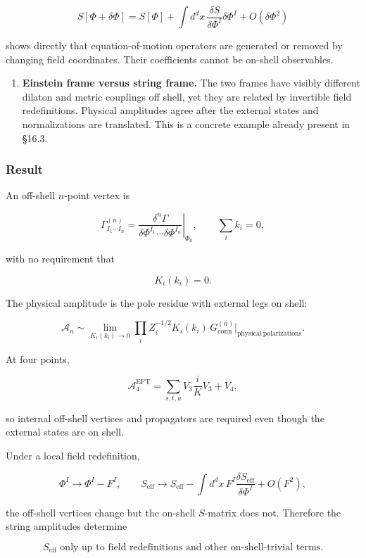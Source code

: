 \documentclass[
  10pt,
  a4paper,
  openany]{book}
\providecommand{\tightlist}{%
  \setlength{\itemsep}{0pt}\setlength{\parskip}{0pt}}
\begin{document}
\[
S[\Phi+\delta\Phi]
=S[\Phi]
+\int d^dx\,
\frac{\delta S}{\delta\Phi^I}\delta\Phi^I
+O(\delta\Phi^2)
\]

shows directly that equation-of-motion operators are generated or
removed by changing field coordinates. Their coefficients cannot be
on-shell observables.

\begin{enumerate}
\def\labelenumi{\arabic{enumi}.}
\setcounter{enumi}{3}
\tightlist
\item
  \textbf{Einstein frame versus string frame.} The two frames have
  visibly different dilaton and metric couplings off shell, yet they are
  related by invertible field redefinitions. Physical amplitudes agree
  after the external states and normalizations are translated. This is a
  concrete example already present in §16.3.
\end{enumerate}

\subsubsection{Result}\label{result-30}

An off-shell \(n\)-point vertex is

\[
\Gamma^{(n)}_{I_1\cdots I_n}
=
\left.
\frac{\delta^n\Gamma}
{\delta\Phi^{I_1}\cdots\delta\Phi^{I_n}}
\right|_{\Phi_0},
\qquad
\sum_i k_i=0,
\]

with no requirement that

\[
K_i(k_i)=0.
\]

The physical amplitude is the pole residue with external legs on shell:

\[
\mathcal A_n
\sim
\lim_{K_i(k_i)\to0}
\prod_i Z_i^{-1/2}K_i(k_i)\,
G^{(n)}_{\mathrm{conn}}
\big|_{\mathrm{physical\ polarizations}}.
\]

At four points,

\[
\mathcal A_4^{\mathrm{EFT}}
=
\sum_{s,t,u}
V_3\frac{i}{K}V_3
+V_4,
\]

so internal off-shell vertices and propagators are required even though
the external states are on shell.

Under a local field redefinition,

\[
\Phi^I\to\Phi^I-F^I,
\qquad
S_{\mathrm{eff}}\to
S_{\mathrm{eff}}-
\int d^dx\,F^I\frac{\delta S_{\mathrm{eff}}}{\delta\Phi^I}
+O(F^2),
\]

the off-shell vertices change but the on-shell \(S\)-matrix does not.
Therefore the string amplitudes determine

\[
\boxed{
S_{\mathrm{eff}}
\text{ only up to field redefinitions and other on-shell-trivial terms.}
}
\]
\end{document}
